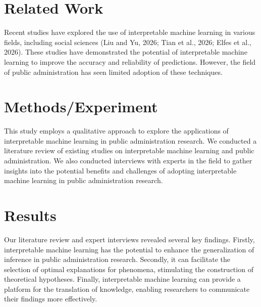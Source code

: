 \documentclass{article}
\begin{document}
\section{Related Work}

Recent studies have explored the use of interpretable machine learning in various fields, including social sciences (Liu and Yu, 2026; Tian et al., 2026; Elfes et al., 2026). These studies have demonstrated the potential of interpretable machine learning to improve the accuracy and reliability of predictions. However, the field of public administration has seen limited adoption of these techniques.

\section{Methods/Experiment}

This study employs a qualitative approach to explore the applications of interpretable machine learning in public administration research. We conducted a literature review of existing studies on interpretable machine learning and public administration. We also conducted interviews with experts in the field to gather insights into the potential benefits and challenges of adopting interpretable machine learning in public administration research.

\section{Results}

Our literature review and expert interviews revealed several key findings. Firstly, interpretable machine learning has the potential to enhance the generalization of inference in public administration research. Secondly, it can facilitate the selection of optimal explanations for phenomena, stimulating the construction of theoretical hypotheses. Finally, interpretable machine learning can provide a platform for the translation of knowledge, enabling researchers to communicate their findings more effectively.
\end{document}
